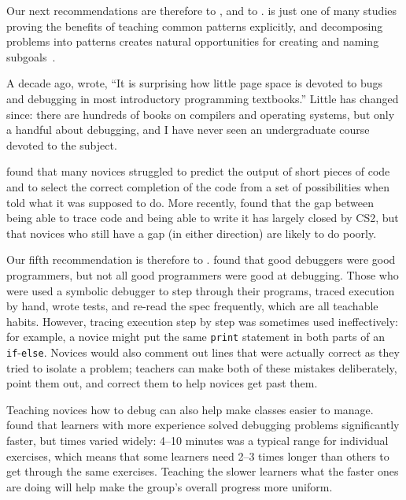 Our next recommendations are therefore
to ,
and to .
\cite{Mull2007b} is just one of many studies proving the benefits of teaching common patterns explicitly,
and decomposing problems into patterns creates natural opportunities
for creating and naming subgoals~\cite{Marg2012,Marg2016}.


A decade ago,
\cite{McCa2008} wrote,
``It is surprising how little page space is devoted to bugs and debugging
in most introductory programming textbooks.''
Little has changed since:
there are hundreds of books on compilers and operating systems,
but only a handful about debugging,
and I have never seen an undergraduate course devoted to the subject.

\cite{List2004,List2009} found that many novices struggled to predict the output of short pieces of code
and to select the correct completion of the code from a set of possibilities
when told what it was supposed to do.
More recently,
\cite{Harr2018} found that the gap between being able to trace code and being able to write it has largely closed by CS2,
but that novices who still have a gap (in either direction) are likely to do poorly.

Our fifth recommendation is therefore to .
\cite{Fitz2008,Murp2008} found that good debuggers were good programmers,
but not all good programmers were good at debugging.
Those who were used a symbolic debugger to step through their programs,
traced execution by hand,
wrote tests,
and re-read the spec frequently,
which are all teachable habits.
However, tracing execution step by step was sometimes used ineffectively:
for example,
a novice might put the same \texttt{print} statement in both parts of an \texttt{if}-\texttt{else}.
Novices would also comment out lines that were actually correct as they tried to isolate a problem;
teachers can make both of these mistakes deliberately,
point them out,
and correct them to help novices get past them.

Teaching novices how to debug can also help make classes easier to manage.
\cite{Alqa2017} found that learners with more experience solved debugging problems significantly faster,
but times varied widely:
4--10 minutes was a typical range for individual exercises,
which means that some learners need 2--3 times longer than others to get through the same exercises.
Teaching the slower learners what the faster ones are doing
will help make the group's overall progress more uniform.

